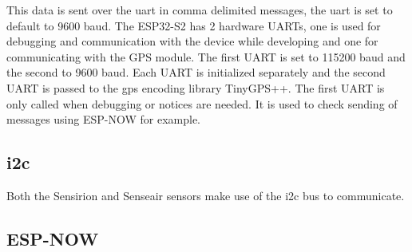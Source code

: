 \noindent
This data is sent over the uart in comma delimited messages, the uart is set to default to 9600 baud.
The ESP32-S2 has 2 hardware UARTs, one is used for debugging and communication with the device while developing and one for communicating with the GPS module. The first UART is set to 115200 baud and the second to 9600 baud. Each UART is initialized separately and the second UART is passed to the gps encoding library TinyGPS++. The first UART is only called when debugging or notices are needed. It is used to check sending of messages using ESP-NOW for example.


\subsection{i2c}
Both the Sensirion and Senseair sensors make use of the i2c bus to communicate. 

\subsection{ESP-NOW}




